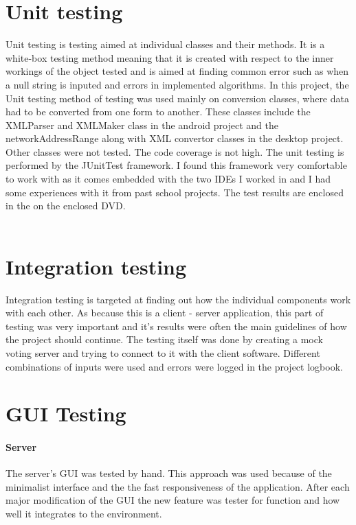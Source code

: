 \documentclass[11pt,twoside,a4paper]{book}
\begin{document}
\section{Unit testing}
Unit testing is testing aimed at individual classes and their methods. It is a white-box testing method meaning that it is created with respect to the inner workings of the object tested and is aimed at finding common error such as when a null string is inputed and errors in implemented algorithms. In this project, the Unit testing method of testing was used mainly on conversion classes, where data had to be converted from one form to another. These classes include the XMLParser and XMLMaker class in the android project and the networkAddressRange along with XML convertor classes in the desktop project. Other classes were not tested. The code coverage is not high. The unit testing is performed by the JUnitTest framework\cite{junit}. I found this framework very comfortable to work with as it comes embedded with the two IDEs I worked in and I had some experiences with it from past school projects. The test results are enclosed in the on the enclosed DVD.\\
\\

\section{Integration testing}
Integration testing is targeted at finding out how the individual components work with each other. As because this is a client - server application, this part of testing was very important and it's results were often the main guidelines of how the project should continue. The testing itself was done by creating a mock voting server and trying to connect to it with the client software. Different combinations of inputs were used and errors were logged in the project logbook\cite{projectPage}.
\section{GUI Testing}
\paragraph{Server}
The server's GUI was tested by hand. This approach was used because of the minimalist interface and the the fast responsiveness of the application. After each major modification of the GUI the new feature was tester for function and how well it integrates to the environment.
\end{document}
